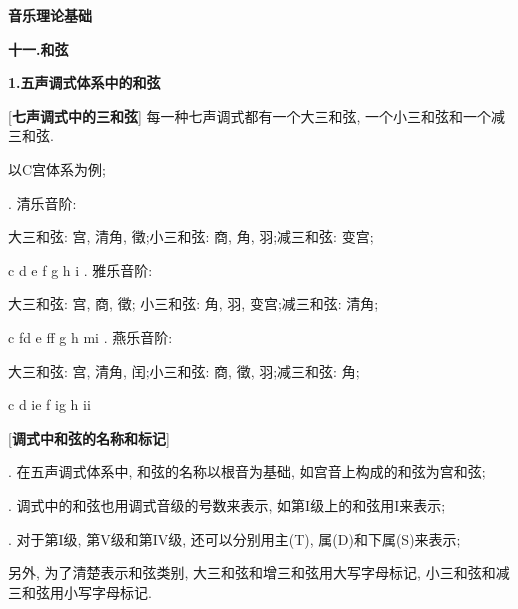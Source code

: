 

\begin{center} 
 \Large \textbf{音乐理论基础}\par
 \textbf{十一.和弦}
\end{center}

\large 
\begin{center}
 \textbf{1.五声调式体系中的和弦}\\
\end{center}

[\textbf{七声调式中的三和弦}] 每一种七声调式都有一个大三和弦, 一个小三和弦和一个减三和弦.\par
\qquad 以C宫体系为例;\par
{}. 清乐音阶: \par
\qquad \qquad 大三和弦: 宫, 清角, 徵;\qquad 小三和弦: 商, 角, 羽;\qquad 减三和弦: 变宫;\par
\startextract
\Notes {} \wh c \en
\Notes {} \wh d \en
\Notes {} \wh e \en
\Notes {} \wh f \en
\Notes {} \wh g \en
\Notes {} \wh h \en
\Notes {} \wh i\en
\zendextract
{}. 雅乐音阶:\par
\qquad \qquad 大三和弦: 宫, 商, 徵; \qquad 小三和弦: 角, 羽, 变宫;\qquad 减三和弦: 清角;\par
\startextract
\Notes {} \wh c \en
\Notes {} \sh f\wh d \en
\Notes {} \wh e \en
\Notes {} \sh f\wh f \en
\Notes {} \wh g \en
\Notes {} \wh h \en
\Notes {} \sh m\wh i \en
\zendextract
{}. 燕乐音阶:\par
\qquad \qquad 大三和弦: 宫, 清角, 闰;\qquad 小三和弦: 商, 徵, 羽;\qquad 减三和弦: 角;\par
\startextract
\Notes {} \wh c \en
\Notes {} \wh d \en
\Notes {} \fl i\wh e \en
\Notes {} \wh f \en
\Notes {} \fl i\wh g \en
\Notes {} \wh h \en
\Notes {} \fl i\wh i \en
\zendextract

[\textbf{调式中和弦的名称和标记}]\par
{}. 在五声调式体系中, 和弦的名称以根音为基础, 如宫音上构成的和弦为宫和弦;\par
{}. 调式中的和弦也用调式音级的号数来表示, 如第I级上的和弦用I来表示;\par
{}. 对于第I级, 第V级和第IV级, 还可以分别用主(T), 属(D)和下属(S)来表示;\par
\qquad 另外, 为了清楚表示和弦类别, 大三和弦和增三和弦用大写字母标记, 小三和弦和减三和弦用小写字母标记.\par


